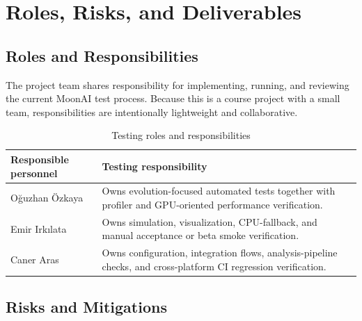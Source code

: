 \section{Roles, Risks, and Deliverables}
\label{sec:roles-risks}

\subsection{Roles and Responsibilities}

The project team shares responsibility for implementing, running, and reviewing the current
MoonAI test process. Because this is a course project with a small team, responsibilities
are intentionally lightweight and collaborative.

\begin{table}[H]
	\centering
	\caption{Testing roles and responsibilities}
	\label{tab:roles}
	\begin{tabularx}{\textwidth}{@{}>{\ttfamily\small}lX@{}}
		\toprule
		\textbf{Responsible personnel} & \textbf{Testing responsibility}                                                                                 \\
		\midrule
		Oğuzhan Özkaya                 & Owns evolution-focused automated tests together with profiler and GPU-oriented performance verification.        \\
		Emir Irkılata                  & Owns simulation, visualization, CPU-fallback, and manual acceptance or beta smoke verification.                 \\
		Caner Aras                     & Owns configuration, integration flows, analysis-pipeline checks, and cross-platform CI regression verification. \\
		\bottomrule
	\end{tabularx}
\end{table}

\subsection{Risks and Mitigations}

